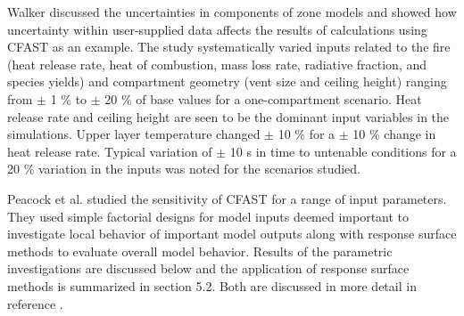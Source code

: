 Walker \cite{Walker:1997} discussed the uncertainties in components of zone models and showed how uncertainty within user-supplied data affects the results of calculations using CFAST as an example. The study systematically varied inputs related to the fire (heat release rate, heat of combustion, mass loss rate, radiative fraction, and species yields) and compartment geometry (vent size and ceiling height) ranging from  $\pm$ 1 \% to $\pm$ 20 \% of base values for a one-compartment scenario. Heat release rate and ceiling height are seen to be the dominant input variables in the simulations. Upper layer temperature changed $\pm$ 10 \% for a $\pm$ 10 \% change in heat release rate. Typical variation of $\pm$ 10 s in time to untenable conditions for a 20 \% variation in the inputs was noted for the scenarios studied.

Peacock et al. \cite{Peacock:1988a} studied the sensitivity of CFAST for a range of input parameters. They used simple factorial designs for model inputs deemed important to investigate local behavior of important model outputs along with response surface methods to evaluate overall model behavior. Results of the parametric investigations are discussed below and the application of response surface methods is summarized in section 5.2. Both are discussed in more detail in reference \cite{Peacock:1988a}.
